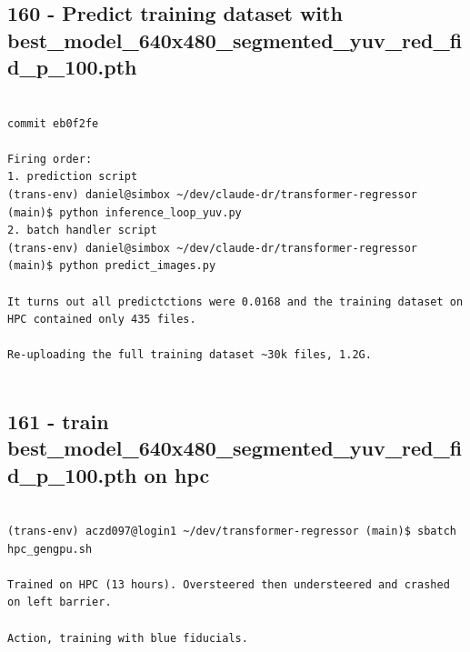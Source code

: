 \subsection{160 - Predict training dataset with best\_model\_640x480\_segmented\_yuv\_red\_fid\_p\_100.pth}
\label{app_res:160}

\begin{verbatim}

commit eb0f2fe

Firing order:
1. prediction script
(trans-env) daniel@simbox ~/dev/claude-dr/transformer-regressor (main)$ python inference_loop_yuv.py
2. batch handler script
(trans-env) daniel@simbox ~/dev/claude-dr/transformer-regressor (main)$ python predict_images.py

It turns out all predictctions were 0.0168 and the training dataset on HPC contained only 435 files.

Re-uploading the full training dataset ~30k files, 1.2G.
    
\end{verbatim}

\subsection{161 - train best\_model\_640x480\_segmented\_yuv\_red\_fid\_p\_100.pth on hpc}
\label{app_res:161}

\begin{verbatim}

(trans-env) aczd097@login1 ~/dev/transformer-regressor (main)$ sbatch hpc_gengpu.sh

Trained on HPC (13 hours). Oversteered then understeered and crashed on left barrier.

Action, training with blue fiducials. 

\end{verbatim}

